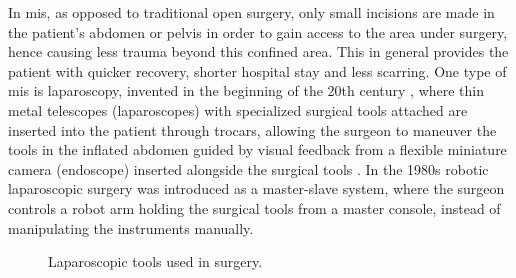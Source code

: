 In \gls{mis}, as opposed to traditional open surgery, only small incisions are made in the patient's abdomen or pelvis in order to gain access to the area under surgery, hence causing less trauma beyond this confined area. This in general provides the patient with quicker recovery, shorter hospital stay and less scarring.
One type of \gls{mis} is \gls{laparoscopy}, invented in the beginning of the 20th century \citep{bib:laparoscopy}, where thin metal telescopes (laparoscopes) with specialized surgical tools attached are inserted into the patient through trocars, allowing the surgeon to maneuver the tools in the inflated abdomen guided by visual feedback from a flexible miniature camera (\gls{endoscope}) inserted alongside the surgical tools \citep{bib:fascrs}.
In the 1980s robotic laparoscopic surgery was introduced as a master-slave system, where the surgeon controls a robot arm holding the surgical tools from a master console, instead of manipulating the instruments manually.

\vspace*{3mm}
\begin{figure}[htbp]
\centering
\begin{minipage}{0.39\textwidth}
%
\vspace*{3mm}
%
\end{minipage}
\hspace*{5mm}
\begin{minipage}{0.258\textwidth}
%
\end{minipage}
\hspace*{5mm}
\begin{minipage}{0.258\textwidth}
%
\end{minipage}
\caption{Laparoscopic tools used in surgery.}
\label{fig:laparoscopy}
\end{figure}

